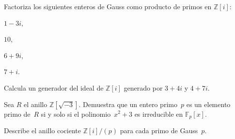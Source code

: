 \documentclass[12pt]{article}
\begin{document}

    
    
    
    
    
    
    
    
    \begin{exercise}[12.5.1]
        Factoriza los siguientes enteros de Gauss como producto de primos en $\mathbb{Z}[i]$: 
        \begin{inparaenum}[\bfseries(a)]
            \item $1-3i$,
            \item $10$,
            \item $6+9i$,
            \item $7+i$.
        \end{inparaenum}
    \end{exercise}
    
    \begin{exercise}[12.5.3]
        Calcula un generador del ideal de $\mathbb{Z}[i]$ generado por $3+4i$ y $4+7i$.
    \end{exercise}
    
    \begin{exercise}[12.5.6]
        Sea $R$ el anillo $\mathbb{Z}[\sqrt{-3}]$. Demuestra que un entero primo~$p$ es un elemento primo de~$R$ si y solo si el polinomio~$x^{2}+3$ es irreducible en $\mathbb{F}_{p}[x]$.
    \end{exercise}
    
    \begin{exercise}[12.5.7]
        Describe el anillo cociente $\mathbb{Z}[i]/(p)$ para cada primo de Gauss~$p$.
    \end{exercise}
    
\end{document}
